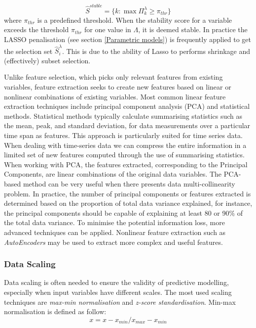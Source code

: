 \begin{equation}
    \hat{S}^{stable} = \{k:\max\Pi^{\lambda}_{k} \geq \pi_{thr}\}
\end{equation}
%
where $\pi_{thr}$ is a predefined threshold. When the stability score for a variable exceeds the threshold $\pi_{thr}$ for one value in $\Lambda$, it is deemed stable. In practice the LASSO penalisation (see section \ref{Parametric models}) is frequently applied to get the selection set $\hat{S}^{\lambda}_{i}$. This is due to the ability of Lasso to performs shrinkage and (effectively) subset selection.


Unlike feature selection, which picks only relevant features from existing variables, feature extraction seeks to create new features based on linear or nonlinear combinations of existing variables. Most common linear feature extraction techniques include principal component analysis (PCA) and statistical methods. Statistical methods typically calculate summarising statistics such as the mean, peak, and standard deviation, for data measurements over a particular time span as features. This approach is particularly suited for time series data. When dealing with time-series data we can compress the entire information in a limited set of new features computed through the use of summarising statistics. When working with PCA, the features extracted, corresponding to the Principal Components, are linear combinations of the original data variables. The PCA-based method can be very useful when there presents data multi-collinearity problem. In practice, the number of principal components or features extracted is determined based on the proportion of total data variance explained, for instance, the principal components should be capable of explaining at least 80 or 90\% of the total data variance. To minimise the potential information loss, more advanced techniques can be applied. Nonlinear feature extraction such as \textit{AutoEncoders} may be used to extract more complex and useful features.


\subsubsection{Data Scaling} \label{Data Scaling}

Data scaling is often needed to ensure the validity of predictive modelling, especially when input variables have different scales. The most used scaling techniques are \textit{max-min normalisation} and \textit{z-score standardisation}. Min-max normalisation is defined as follow:
\begin{equation}
    x = x - x_{min} / x_{max} - x_{min}
\end{equation}

